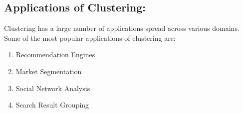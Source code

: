 \documentclass[Proceedings]{ascelike}
\begin{document}
\subsection{Applications of Clustering:}


Clustering has a large number of applications spread across various domains. Some of the most popular applications of clustering are:
\begin{enumerate}
	\item Recommendation Engines
	\item Market Segmentation
	\item Social Network Analysis
	\item Search Result Grouping
\end{enumerate}
\end{document}
